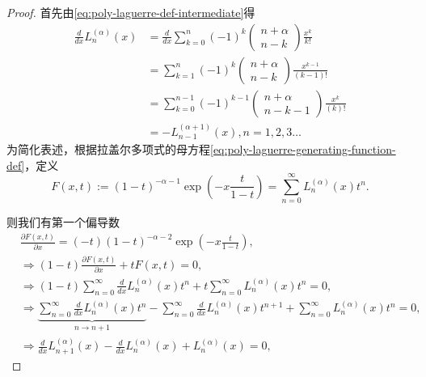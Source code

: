 \begin{subappendices}
\begin{proof}
首先由\eqref{eq:poly-laguerre-def-intermediate}得
\begin{equation}
  \label{eq:poly-laguerre-diff-x}
\begin{split}
    \frac{d}{dx} L_n^{(\alpha)}(x) &= \frac{d}{dx} \sum_{k=0}^{n} (-1)^k \begin{pmatrix}
    n+\alpha \\ n-k
  \end{pmatrix} \frac{x^k}{k!}\\
  &=\sum_{k=1}^{n} (-1)^k \begin{pmatrix}
  n+\alpha \\ n-k
\end{pmatrix}  \frac{x^{k-1}}{(k-1)!} \\
&= \sum_{k=0}^{n-1} (-1)^{k-1} \begin{pmatrix}
n+\alpha \\ n-k-1
\end{pmatrix}  \frac{x^{k}}{(k)!}\\
&= - L_{n-1}^{(\alpha + 1)}(x), n=1,2,3\ldots
\end{split}
\end{equation}
为简化表述，根据拉盖尔多项式的母方程\eqref{eq:poly-laguerre-generating-function-def}，定义
\begin{equation*}
  F(x,t) := (1-t)^{-\alpha - 1} \exp \left( - x \frac{t}{1-t} \right) = \sum_{n=0}^{\infty} L_n^{(\alpha)}(x) t^n.
\end{equation*}

则我们有第一个偏导数
\begin{equation}
  \label{eq:poly-laguerre-three-partial-f-x}
  \begin{split}
    &\frac{\partial F(x,t)}{\partial x} = (-t) (1-t)^{-\alpha - 2} \exp \left( - x \frac{t}{1-t} \right), \\
    &\Rightarrow (1-t) \frac{\partial F(x,t)}{\partial x} + t F(x,t) = 0,\\
    &\Rightarrow (1-t) \sum_{n=0}^{\infty} \frac{d}{dx} L_n^{(\alpha)}(x) t^n + t \sum_{n=0}^{\infty} L_n^{(\alpha)} (x) t^n = 0, \\
    & \Rightarrow \underbrace{\sum_{n=0}^{\infty} \frac{d}{dx} L_n^{(\alpha)}(x) t^n}_{n\rightarrow n+1} - \sum_{n=0}^{\infty} \frac{d}{dx} L_n^{(\alpha)}(x) t^{n+1} + \sum_{n=0}^{\infty} L_n^{(\alpha)} (x) t^n = 0,\\
    & \Rightarrow \frac{d}{dx} L_{n+1}^{(\alpha)}(x)
    - \frac{d}{dx} L_n^{(\alpha)}(x)
    + L_n^{(\alpha)} (x)= 0,
  \end{split}
\end{equation}


\end{proof}
\end{subappendices}
